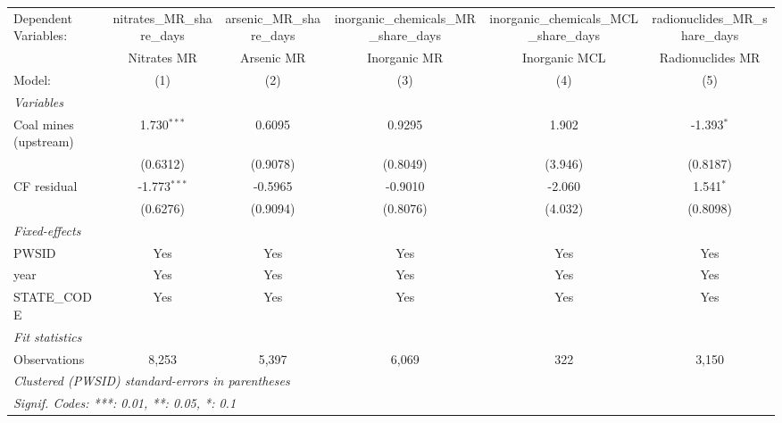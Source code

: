 
\begingroup
\centering
\begin{tabular}{lccccc}
   \tabularnewline \midrule \midrule
   Dependent Variables:  & nitrates\_MR\_share\_days    & arsenic\_MR\_share\_days    & inorganic\_chemicals\_MR\_share\_days     & inorganic\_chemicals\_MCL\_share\_days     & radionuclides\_MR\_share\_days\\     
                         & Nitrates MR                  & Arsenic MR                  & Inorganic MR                              & Inorganic MCL                              & Radionuclides MR \\   
   Model:                & (1)                          & (2)                         & (3)                                       & (4)                                        & (5)\\  
   \midrule
   \emph{Variables}\\
   Coal mines (upstream) & 1.730$^{***}$                & 0.6095                      & 0.9295                                    & 1.902                                      & -1.393$^{*}$\\   
                         & (0.6312)                     & (0.9078)                    & (0.8049)                                  & (3.946)                                    & (0.8187)\\   
   CF residual           & -1.773$^{***}$               & -0.5965                     & -0.9010                                   & -2.060                                     & 1.541$^{*}$\\   
                         & (0.6276)                     & (0.9094)                    & (0.8076)                                  & (4.032)                                    & (0.8098)\\   
   \midrule
   \emph{Fixed-effects}\\
   PWSID                 & Yes                          & Yes                         & Yes                                       & Yes                                        & Yes\\  
   year                  & Yes                          & Yes                         & Yes                                       & Yes                                        & Yes\\  
   STATE\_CODE           & Yes                          & Yes                         & Yes                                       & Yes                                        & Yes\\  
   \midrule
   \emph{Fit statistics}\\
   Observations          & 8,253                        & 5,397                       & 6,069                                     & 322                                        & 3,150\\  
   \midrule \midrule
   \multicolumn{6}{l}{\emph{Clustered (PWSID) standard-errors in parentheses}}\\
   \multicolumn{6}{l}{\emph{Signif. Codes: ***: 0.01, **: 0.05, *: 0.1}}\\
\end{tabular}
 
